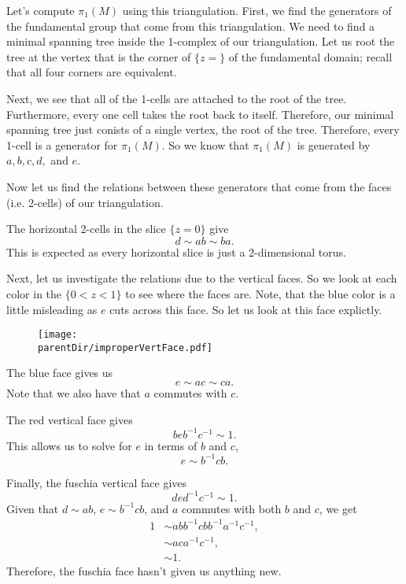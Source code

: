 Let's compute \(\pi_1(M)\) using this triangulation. First, we find the generators of the fundamental group that come from this
triangulation. We need to find a minimal spanning tree inside the 1-complex of our triangulation. Let us root the tree at the
vertex that is the corner of \(\{z = \}\) of the fundamental domain; recall that all four corners are equivalent.

Next, we see that all of the 1-cells are attached to the root of the tree. Furthermore, every one cell takes the root back to itself. Therefore,
our minimal spanning tree just conists of a single vertex, the root of the tree. Therefore, every 1-cell is a generator for \(\pi_1(M)\). So
we know that \(\pi_1(M)\) is generated by \(a, b, c, d,\) and \(e\).

Now let us find the relations between these generators that come from the faces (i.e. 2-cells) of our triangulation.

The horizontal 2-cells in the slice \(\{z = 0\}\) give 
\begin{equation}
d \sim ab \sim ba. 
\end{equation}
This is expected as every horizontal slice is just a 2-dimensional torus.

Next, let us investigate the relations due to the vertical faces. So we look at each color in the \(\{0 < z < 1\}\) to see where the faces are.
Note, that the blue color is a little misleading as \(e\) cuts across this face. So let us look at this face explictly.
\begin{figure}[H]
\centering
\texttt{[image: \\parentDir/improperVertFace.pdf]}
\end{figure}
The blue face gives us
\begin{equation}
e \sim ac \sim ca.
\end{equation}
Note that we also have that \(a\) commutes with \(c\).

The red vertical face gives
\begin{equation}
beb^{-1}c^{-1} \sim 1.
\end{equation}
This allows us to solve for \(e\) in terms of \(b\) and \(c\),
\begin{equation}
e \sim b^{-1}cb.
\end{equation}

Finally, the fuschia vertical face gives
\begin{equation}
ded^{-1}c^{-1} \sim 1.
\end{equation}
Given that \(d \sim ab\), \(e\sim b^{-1}cb\), and \(a\) commutes with both \(b\) and \(c\), we get
\begin{align}
1 & \sim abb^{-1}cbb^{-1}a^{-1}c^{-1}, \\
& \sim aca^{-1}c^{-1}, \\
& \sim 1.
\end{align}
Therefore, the fuschia face hasn't given us anything new.

